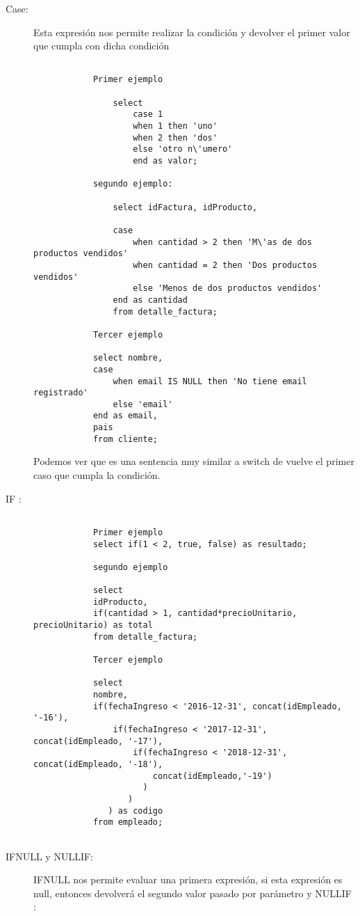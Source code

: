 \begin{description}
	\item[Case: ] Esta expresi\'on nos permite realizar la condici\'on y devolver el primer valor que cumpla con dicha condici\'on
		\begin{example}
			\begin{verbatim}
				
			Primer ejemplo
			
				select 
					case 1
					when 1 then 'uno'
					when 2 then 'dos'
					else 'otro n\'umero'
					end as valor;
					
			segundo ejemplo:
			
				select idFactura, idProducto,
				
				case 
					when cantidad > 2 then 'M\'as de dos productos vendidos'
					when cantidad = 2 then 'Dos productos vendidos'
					else 'Menos de dos productos vendidos'
				end as cantidad
				from detalle_factura;

			Tercer ejemplo
			
			select nombre,
			case
				when email IS NULL then 'No tiene email registrado'
				else 'email'
			end as email,
			pais
			from cliente;
			\end{verbatim}
		Podemos ver que es una sentencia muy similar a switch de vuelve el primer caso que cumpla la condici\'on. 
		\end{example}
	\item[IF :] 
	\begin{example}
		\begin{verbatim}

			Primer ejemplo
			select if(1 < 2, true, false) as resultado;
			
			segundo ejemplo
			
			select 
			idProducto,
			if(cantidad > 1, cantidad*precioUnitario, precioUnitario) as total
			from detalle_factura;
			
			Tercer ejemplo
			
			select
			nombre,
			if(fechaIngreso < '2016-12-31', concat(idEmpleado, '-16'),
				if(fechaIngreso < '2017-12-31', concat(idEmpleado, '-17'),
					if(fechaIngreso < '2018-12-31', concat(idEmpleado, '-18'),
						concat(idEmpleado,'-19')
					  )
				   )
			   ) as codigo
			from empleado;
			 
		\end{verbatim}
	\end{example}
	\item[IFNULL y NULLIF:] IFNULL nos permite evaluar una primera expresi\'on, si esta expresi\'on es null, entonces devolver\'a el segundo valor pasado por par\'ametro y NULLIF : 
	\begin{example}
		\begin{verbatim}
			

\end{verbatim}
\end{example}
\end{description}

